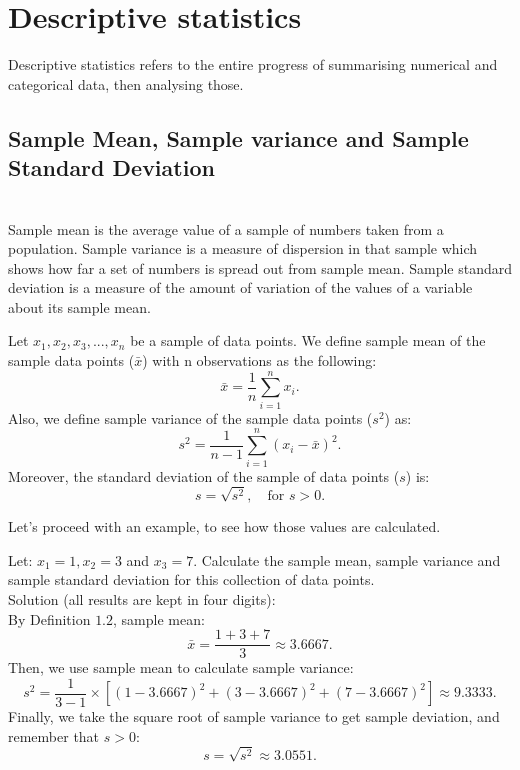 \section{Descriptive statistics}

Descriptive statistics refers to the entire progress of summarising numerical and categorical data, then analysing those.\\ 

\noindent
\subsection{Sample Mean, Sample variance and Sample Standard Deviation}\\

\noindent
Sample mean is the average value of a sample of numbers taken from a population. Sample variance is a measure of dispersion in that sample which shows how far a set of numbers is spread out from sample mean. Sample standard deviation is a measure of the amount of variation of the values of a variable about its sample mean.

\begin{definition}
	Let $x_1, x_2, x_3, ..., x_n$ be a sample of data points. We define sample mean of the sample data points ($\bar{x}$) with n observations as the following: 
	$$ \bar{x} = \frac{1}{n} \sum_{i=1}^{n} x_i. $$
	Also, we define sample variance of the sample data points ($s^2$) as: \[ s^2 = \frac{1}{n-1} \sum_{i=1}^{n}(x_i - \bar{x})^2.\] Moreover, the standard deviation of the sample of data points ($s$) is: \[ s = \sqrt{s^2}, \quad \text{for } s > 0.\]
\end{definition}

Let's proceed with an example, to see how those values are calculated.

\begin{example}
Let: $x_1 = 1, x_2 = 3$ and $x_3 = 7$. Calculate the sample mean, sample variance and sample standard deviation for this collection of data points.\\

Solution (all results are kept in four digits):\\
\noindent
By Definition $1.2$, sample mean: \[ \bar{x} = \frac{1+3+7}{3} \approx 3.6667.\]
Then, we use sample mean to calculate sample variance: \[ s^2 = \frac{1}{3-1} \times [(1-3.6667)^2+(3-3.6667)^2+(7-3.6667)^2] \approx 9.3333.\]
Finally, we take the square root of sample variance to get sample deviation, and remember that $s > 0$: \[ s = \sqrt{s^2} \approx 3.0551.\]
\end{example}


